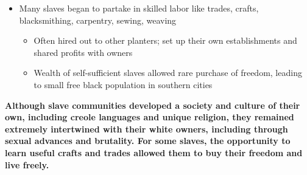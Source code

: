 \documentclass[a4paper]{article}
\begin{document}
{\begin{itemize}
\begin{itemize}
        \end{itemize}
        \item Many slaves began to partake in skilled labor like trades, crafts, blacksmithing, carpentry, sewing, weaving
        \begin{itemize}
            \item Often hired out to other planters; set up their own establishments and shared profits with owners
            \item Wealth of self-sufficient slaves allowed rare purchase of freedom, leading to small free black population in southern cities 
        \end{itemize}
    \end{itemize}
    \textbf{Although slave communities developed a society and culture of their own, including creole languages and unique religion, they remained extremely intertwined with their white owners, including through sexual advances and brutality. For some slaves, the opportunity to learn useful crafts and trades allowed them to buy their freedom and live freely.}}
\end{document}
